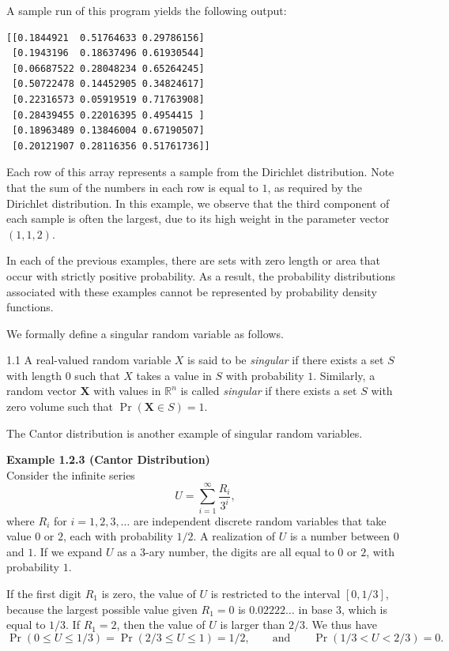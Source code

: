 A sample run of this program yields the following output:
\begin{verbatim}
[[0.1844921  0.51764633 0.29786156]
 [0.1943196  0.18637496 0.61930544]
 [0.06687522 0.28048234 0.65264245]
 [0.50722478 0.14452905 0.34824617]
 [0.22316573 0.05919519 0.71763908]
 [0.28439455 0.22016395 0.4954415 ]
 [0.18963489 0.13846004 0.67190507]
 [0.20121907 0.28116356 0.51761736]]
\end{verbatim}

Each row of this array represents a sample from the Dirichlet distribution. Note that the sum of the numbers in each row is equal to $1$, as required by the Dirichlet distribution. In this example, we observe that the third component of each sample is often the largest, due to its high weight in the parameter vector $(1,1,2)$.

In each of the previous examples, there are sets with zero length or area that occur with strictly positive probability. As a result, the probability distributions associated with these examples cannot be represented by probability density functions.

We formally define a singular random variable as follows.

\begin{defbox}{1.1}
A real-valued random variable $X$ is said to be \textit{singular} if there exists a set $S$ with length $0$ such that $X$ takes a value in $S$ with probability $1$. Similarly, a random vector $\mathbf{X}$ with values in $\mathbb{R}^n$ is called \textit{singular} if there exists a set $S$ with zero volume such that $\Pr(\mathbf{X}\in S)=1$.

The Cantor distribution is another example of singular random variables.
\end{defbox}

\textbf{Example 1.2.3 (Cantor Distribution)} \\
Consider the infinite series
\[
U=\sum_{i=1}^{\infty} \frac{R_i}{3^i},
\]
where $R_i$ for $i=1,2,3,\dots$ are independent discrete random variables that take value $0$ or $2$, each with probability $1/2$. A realization of $U$ is a number between $0$ and $1$. If we expand $U$ as a $3$-ary number, the digits are all equal to $0$ or $2$, with probability $1$.

If the first digit $R_1$ is zero, the value of $U$ is restricted to the interval $[0,1/3]$, because the largest possible value given $R_1=0$ is $0.02222\ldots$ in base $3$, which is equal to $1/3$. If $R_1=2$, then the value of $U$ is larger than $2/3$. We thus have
\[
\Pr(0\le U\le 1/3)=\Pr(2/3\le U\le 1)=1/2,\qquad \text{and} \qquad \Pr(1/3<U<2/3)=0.
\]

